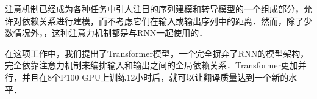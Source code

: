 
注意机制已经成为各种任务中引人注目的序列建模和转导模型的一个组成部分，允许对依赖关系进行建模，而不考虑它们在输入或输出序列中的距离\citep{bahdanau2014neural, structuredAttentionNetworks}．然而，除了少数情况外，\citep{decomposableAttnModel}，这种注意力机制都是与RNN一起使用的．



在这项工作中，我们提出了Transformer模型，一个完全摒弃了RNN的模型架构，完全依靠注意力机制来编排输入和输出之间的全局依赖关系．Transformer更加并行，并且在8个P100 GPU上训练12小时后，就可以让翻译质量达到一个新的水平．


